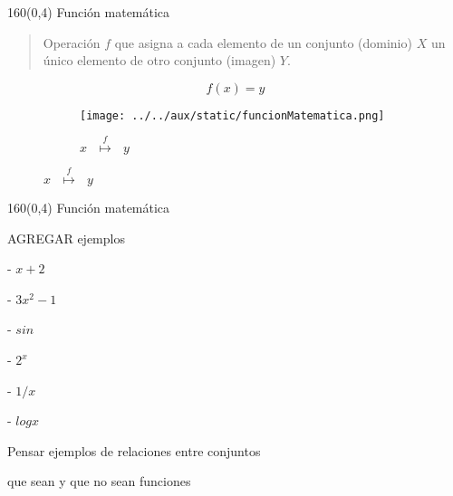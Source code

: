 \documentclass[shownotes,aspectratio=169]{beamer}
\begin{document}
\begin{frame}[plain]
\begin{textblock}{160}(0,4)
 \centering \LARGE Función matemática
\end{textblock}
\vspace{1.25cm}
 
\begin{quote}
 Operación $f$ que asigna a cada elemento de un conjunto (dominio) $X$
un único elemento de otro conjunto (imagen) $Y$.
\end{quote}

\begin{equation}
 f(x)=y
\end{equation}

\pause

 \begin{figure}[H]
    \centering
    \begin{subfigure}[t]{0.3\textwidth}
      \texttt{[image: ../../aux/static/funcionMatematica.png]}
            \caption*{$x \ \ \  \overset{f}{\longmapsto} \ \ \  y $}
    \end{subfigure}
\end{figure}
 
\end{frame}

\begin{frame}[plain]
\begin{textblock}{160}(0,4)
 \centering \LARGE Función matemática
\end{textblock}
\vspace{1.25cm}

AGREGAR ejemplos 

- $x + 2$

- $3x^2-1$

- $sin$

- $2^x$

- $1/x$

- $log x$

\end{frame}


\begin{frame}
 
 \begin{center}
  Pensar ejemplos de relaciones entre conjuntos 
  
  que sean y que no sean funciones
 \end{center}

 
\end{frame}
\end{document}
